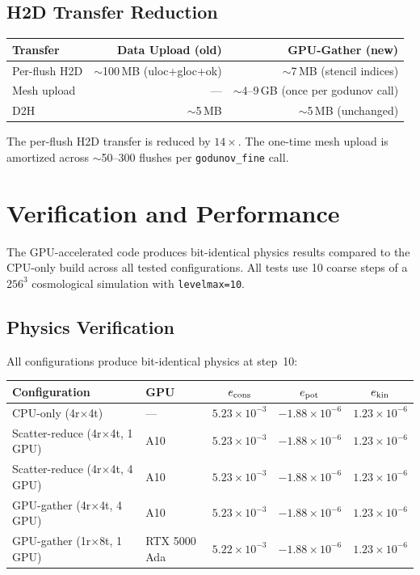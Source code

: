 \documentclass[11pt,fleqn]{book}
\begin{document}
\subsection{H2D Transfer Reduction}

\begin{center}
\begin{tabular}{lrr}
\toprule
\textbf{Transfer} & \textbf{Data Upload (old)} & \textbf{GPU-Gather (new)} \\
\midrule
Per-flush H2D & $\sim$100\,MB (uloc+gloc+ok) & $\sim$7\,MB (stencil indices) \\
Mesh upload   & --- & $\sim$4--9\,GB (once per godunov call) \\
D2H           & $\sim$5\,MB & $\sim$5\,MB (unchanged) \\
\bottomrule
\end{tabular}
\end{center}

The per-flush H2D transfer is reduced by $14\times$.  The one-time mesh upload is amortized across $\sim$50--300 flushes per \texttt{godunov\_fine} call.

\section{Verification and Performance}

The GPU-accelerated code produces bit-identical physics results compared to the CPU-only build across all tested configurations.  All tests use 10 coarse steps of a $256^3$ cosmological simulation with \texttt{levelmax=10}.

\subsection{Physics Verification}

All configurations produce bit-identical physics at step~10:

\begin{center}
\begin{tabular}{llccc}
\toprule
\textbf{Configuration} & \textbf{GPU} & $e_{\rm cons}$ & $e_{\rm pot}$ & $e_{\rm kin}$ \\
\midrule
CPU-only (4r$\times$4t)              & ---          & $5.23 \times 10^{-3}$ & $-1.88 \times 10^{-6}$ & $1.23 \times 10^{-6}$ \\
Scatter-reduce (4r$\times$4t, 1 GPU) & A10          & $5.23 \times 10^{-3}$ & $-1.88 \times 10^{-6}$ & $1.23 \times 10^{-6}$ \\
Scatter-reduce (4r$\times$4t, 4 GPU) & A10          & $5.23 \times 10^{-3}$ & $-1.88 \times 10^{-6}$ & $1.23 \times 10^{-6}$ \\
GPU-gather (4r$\times$4t, 4 GPU)     & A10          & $5.23 \times 10^{-3}$ & $-1.88 \times 10^{-6}$ & $1.23 \times 10^{-6}$ \\
GPU-gather (1r$\times$8t, 1 GPU)     & RTX 5000 Ada & $5.22 \times 10^{-3}$ & $-1.88 \times 10^{-6}$ & $1.23 \times 10^{-6}$ \\
\bottomrule
\end{tabular}
\end{center}
\end{document}
